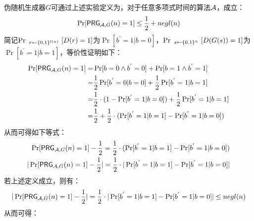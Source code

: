 \begin{questions}
        \begin{solution}
            \newline
            伪随机生成器$G$可通过上述实验定义为，对于任意多项式时间的算法$\mathcal{A}$，成立：
            \begin{equation}
                \begin{aligned}
                    \Pr[\mathsf{PRG}_{\mathcal{A},G}(n)=1]\leq\frac{1}{2}+negl(n)
                \end{aligned}
            \end{equation}
            简记$\Pr\ _{r\leftarrow{\set{0,1}^{l(n)}}}\ [D(r)=1]$为$\Pr[{b}^{'}=1|b=0]$，$\Pr\ _{s\leftarrow{\set{0,1}^n}}\ [D(G(s))=1]$为$\Pr[{b}^{'}=1|b=1]$，等价性证明如下：
            \begin{equation}
                \begin{aligned}
                    \Pr[\mathsf{PRG}_{\mathcal{A},G}(n)=1]=&\Pr[b=0\wedge{b}^{'}=0]+\Pr[b=1\wedge{b}^{'}=1]\\
                    =&\frac{1}{2}\Pr[{b}^{'}=0|b=0]+\frac{1}{2}\Pr[{b}^{'}=1|b=1]\\
                    =&\frac{1}{2}\cdot(1-\Pr[{b}^{'}=1|b=0])+\frac{1}{2}\Pr[{b}^{'}=1|b=1]\\
                    =&\frac{1}{2}+\frac{1}{2}\cdot(\Pr[{b}^{'}=1|b=1]-\Pr[{b}^{'}=1|b=0])
                \end{aligned}
            \end{equation}
            从而可得如下等式：
            \begin{equation}
                \begin{aligned}
                    \Pr[\mathsf{PRG}_{\mathcal{A},G}(n)=1]-\frac{1}{2}=\frac{1}{2}\cdot(\Pr[{b}^{'}=1|b=1]-\Pr[{b}^{'}=1|b=0])\\
                    |\Pr[\mathsf{PRG}_{\mathcal{A},G}(n)=1]-\frac{1}{2}|=\frac{1}{2}\cdot|\Pr[{b}^{'}=1|b=1]-\Pr[{b}^{'}=1|b=0]|
                \end{aligned}
            \end{equation}
            若上述定义成立，则有：
            \begin{equation}
                \begin{aligned}
                    |\Pr[\mathsf{PRG}_{\mathcal{A},G}(n)=1]-\frac{1}{2}|=\frac{1}{2}\cdot|\Pr[{b}^{'}=1|b=1]-\Pr[{b}^{'}=1|b=0]|\leq{negl}(n)
                \end{aligned}
            \end{equation}
            从而可得：
            \begin{equation}

\end{equation}
\end{solution}
\end{questions}
